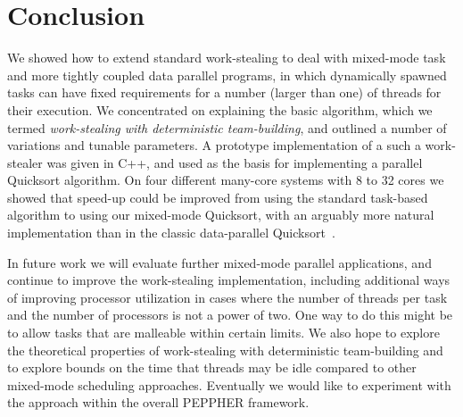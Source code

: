\documentclass[preprint]{sigplanconf}
\begin{document}
\section{Conclusion}

We showed how to extend standard work-stealing to deal with mixed-mode
task and more tightly coupled data parallel programs, in which
dynamically spawned tasks can have fixed requirements for a number
(larger than one) of threads for their execution. We concentrated on
explaining the basic algorithm, which we termed \emph{work-stealing
with deterministic team-building}, and outlined a number of variations
and tunable parameters. A prototype implementation of a such a
work-stealer was given in C++, and used as the basis for implementing
a parallel Quicksort algorithm. On four different many-core systems
with 8 to 32 cores we showed that speed-up could be
improved from  using the standard task-based algorithm to 
using our mixed-mode Quicksort, with an arguably more natural
implementation than in the classic data-parallel
Quicksort~\cite{TsigasZhang03}. 

In future work we will evaluate further mixed-mode parallel
applications, and continue to improve the work-stealing
implementation, including additional ways of improving processor
utilization in cases where the number of threads per task and the
number of processors is not a power of two. One way to do this might
be to allow tasks that are malleable within certain limits. We also
hope to explore the theoretical properties of work-stealing with
deterministic team-building and to explore bounds on the time that
threads may be idle compared to other mixed-mode scheduling
approaches. Eventually we would like to experiment with the approach within
the overall PEPPHER framework.
\end{document}
